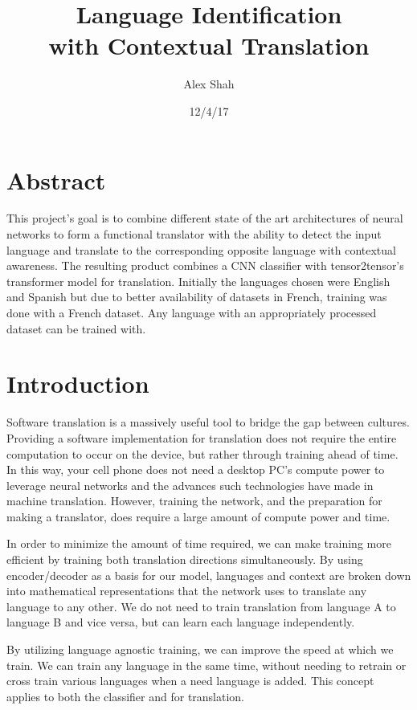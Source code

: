 \documentclass[10pt,a4paper]{article}
\begin{document}
\title{Language Identification \\ with Contextual Translation}
\author{Alex Shah}
\date{12/4/17}


\maketitle


\section{Abstract}


   This project's goal is to combine different state of the art architectures of neural networks to form a functional translator with the ability to detect the input language and translate to the corresponding opposite language with contextual awareness. The resulting product combines a CNN classifier with tensor2tensor's transformer model for translation. Initially the languages chosen were English and Spanish but due to better availability of datasets in French, training was done with a French dataset. Any language with an appropriately processed dataset can be trained with.


\section{Introduction}


  Software translation is a massively useful tool to bridge the gap between cultures. Providing a software implementation for translation does not require the entire computation to occur on the device, but rather through training ahead of time. In this way, your cell phone does not need a desktop PC's compute power to leverage neural networks and the advances such technologies have made in machine translation. However, training the network, and the preparation for making a translator, does require a large amount of compute power and time.


  In order to minimize the amount of time required, we can make training more efficient by training both translation directions simultaneously. By using encoder/decoder as a basis for our model, languages and context are broken down into mathematical representations that the network uses to translate any language to any other. We do not need to train translation from language A to language B and vice versa, but can learn each language independently.


  By utilizing language agnostic training, we can improve the speed at which we train. We can train any language in the same time, without needing to retrain or cross train various languages when a need language is added. This concept applies to both the classifier and for translation. 
\end{document}
